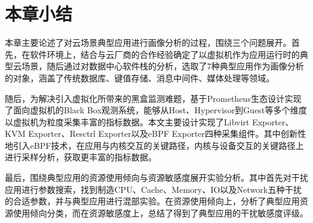 \section{本章小结}

本章主要论述了对云场景典型应用进行画像分析的过程，围绕三个问题展开。首先，在软件环境上，结合与云厂商的合作经验确定了以虚拟机作为应用运行时的典型云场景，随后通过对数据中心软件栈的分析，选取了7种典型应用作为画像分析的对象，涵盖了传统数据库、键值存储、消息中间件、媒体处理等领域。

随后，为解决引入虚拟化所带来的黑盒监测难题，基于Prometheus生态设计实现了面向虚拟机的Black Box观测系统，能够从Host、Hypervisor到Guest等多个维度以虚拟机为粒度采集丰富的指标数据。本文主要设计实现了Libvirt Exporter、KVM Exporter、Resctrl Exporter以及eBPF Exporter四种采集组件。其中创新性地引入eBPF技术，在应用与内核交互的关键路径，内核与设备交互的关键路径上进行采样分析，获取更丰富的指标数据。

最后，围绕典型应用的资源使用倾向与资源敏感度展开实验分析。其中首先对干扰应用进行参数搜索，找到制造CPU、Cache、Memory、IO以及Network五种干扰的合适参数，并与典型应用进行混部实验。在资源使用倾向上，分析了典型应用资源使用倾向分类，而在资源敏感度上，总结了得到了典型应用的干扰敏感度评级。
